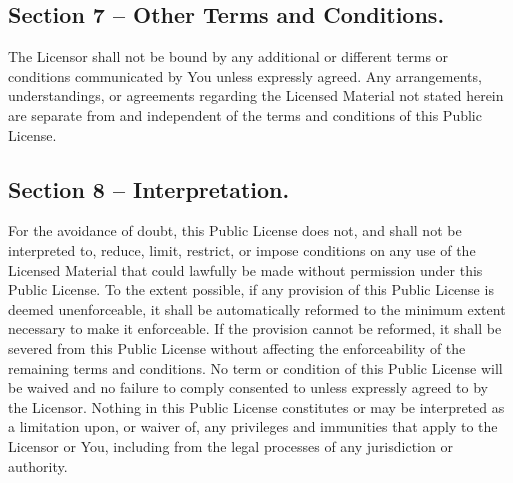 \subsection{Section 7 – Other Terms and Conditions.}

The Licensor shall not be bound by any additional or different terms or conditions communicated by You unless expressly agreed.
Any arrangements, understandings, or agreements regarding the Licensed Material not stated herein are separate from and independent of the terms and conditions of this Public License.

\subsection{Section 8 – Interpretation.}

For the avoidance of doubt, this Public License does not, and shall not be interpreted to, reduce, limit, restrict, or impose conditions on any use of the Licensed Material that could lawfully be made without permission under this Public License.
To the extent possible, if any provision of this Public License is deemed unenforceable, it shall be automatically reformed to the minimum extent necessary to make it enforceable. If the provision cannot be reformed, it shall be severed from this Public License without affecting the enforceability of the remaining terms and conditions.
No term or condition of this Public License will be waived and no failure to comply consented to unless expressly agreed to by the Licensor.
Nothing in this Public License constitutes or may be interpreted as a limitation upon, or waiver of, any privileges and immunities that apply to the Licensor or You, including from the legal processes of any jurisdiction or authority.
